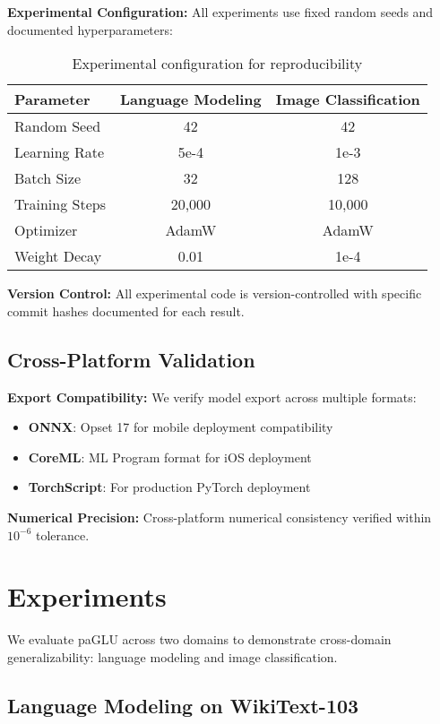 \documentclass[11pt]{article}
\begin{document}
\textbf{Experimental Configuration:} All experiments use fixed random seeds and documented hyperparameters:

\begin{table}[ht]
\centering
\caption{Experimental configuration for reproducibility}
\label{tab:config}
\begin{tabular}{lcc}
\toprule
Parameter & Language Modeling & Image Classification \\
\midrule
Random Seed & 42 & 42 \\
Learning Rate & 5e-4 & 1e-3 \\
Batch Size & 32 & 128 \\
Training Steps & 20,000 & 10,000 \\
Optimizer & AdamW & AdamW \\
Weight Decay & 0.01 & 1e-4 \\
\bottomrule
\end{tabular}
\end{table}

\textbf{Version Control:} All experimental code is version-controlled with specific commit hashes documented for each result.

\subsection{Cross-Platform Validation}

\textbf{Export Compatibility:} We verify model export across multiple formats:
\begin{itemize}
    \item \textbf{ONNX}: Opset 17 for mobile deployment compatibility
    \item \textbf{CoreML}: ML Program format for iOS deployment
    \item \textbf{TorchScript}: For production PyTorch deployment
\end{itemize}

\textbf{Numerical Precision:} Cross-platform numerical consistency verified within $10^{-6}$ tolerance.

\section{Experiments}
\label{sec:experiments}

We evaluate paGLU across two domains to demonstrate cross-domain generalizability: language modeling and image classification.

\subsection{Language Modeling on WikiText-103}
\label{sec:nlp}
\end{document}
